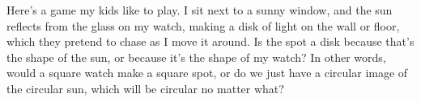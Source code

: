 Here's a game my kids like to play. I sit next to a sunny
window, and the sun reflects from the glass on my watch,
making a disk of light on the wall or floor, which they
pretend to chase as I move it around. Is the spot a disk
because that's the shape of the sun, or because it's the
shape of my watch? In other words, would a square watch make
a square spot, or do we just have a circular image of the
circular sun, which will be circular no matter what?
